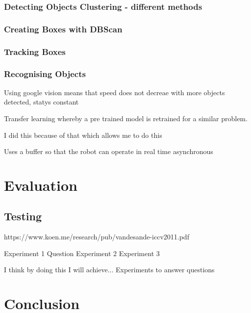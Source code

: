 \documentclass{mproj}
\begin{document}
\subsection{Detecting Objects Clustering - different methods}
\subsection{Creating Boxes with DBScan}
\subsection{Tracking Boxes}
\subsection{Recognising Objects}

Using google vision means that speed does not decreae with more objects detected, statys constant

Transfer learning whereby a pre trained model is retrained for a similar problem.

I did this because of that which allows me to do this



Uses a buffer so that the robot can operate in real time asynchronous















\chapter{Evaluation}
\section{Testing}
https://www.koen.me/research/pub/vandesande-iccv2011.pdf

Experiment 1
Question
Experiment 2
Experiment 3


I think by doing this I will achieve...
Experiments to answer questions

\chapter{Conclusion}\label{conclusion}
\end{document}
